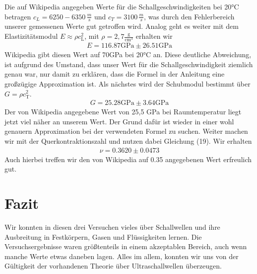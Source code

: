 \documentclass[a4paper, 12pt]{scrartcl}
\begin{document}
Die auf Wikipedia angegeben Werte für die Schallgeschwindigkeiten bei 20°C betragen $c_L=6250-6350\,\frac{m}{s}$ und $c_T=3100\,\frac{m}{s}$, was durch den Fehlerbereich unserer gemessenen Werte gut getroffen wird. Analog geht es weiter mit dem Elastizitätsmodul $E\approx \rho c_\textrm{L}^2$, mit $\rho = 2,7\frac{\textrm{g}}{\textrm{cm}^3}$ erhalten wir
\begin{align*}
E = 116.87 \textrm{GPa} \pm 26.51 \textrm{GPa}
\end{align*}
Wikipedia gibt diesen Wert auf 70GPa bei 20°C an. Diese deutliche Abweichung, ist aufgrund des Umstand, dass unser Wert für die Schallgeschwindigkeit ziemlich genau war, nur damit zu erklären, dass die Formel in der Anleitung eine großzügige Approximation ist. Als nächstes wird der Schubmodul bestimmt über $G=\rho c_\textrm{T}^2$. 
\begin{align*}
G = 25.28 \textrm{GPa} \pm 3.64 \textrm{GPa}
\end{align*}
Der von Wikipedia angegebene Wert von 25,5 GPa bei Raumtemperatur liegt jetzt viel näher an unserem Wert. Der Grund dafür ist wieder in einer wohl genauern Approximation bei der verwendeten Formel zu suchen. Weiter machen wir mit der Querkontraktionszahl und nutzen dabei Gleichung (19). Wir erhalten 
\begin{align*}
\nu = 0.3620 \pm 0.0473 
\end{align*}
Auch hierbei treffen wir den von Wikipedia auf 0.35 angegebenen Wert erfreulich gut.
\newpage
\section{Fazit}
Wir konnten in diesen drei Versuchen vieles über Schallwellen und ihre Ausbreitung in Festkörpern, Gasen und Flüssigkeiten lernen. Die Versuchsergebnisse waren größtenteils in einem akzeptablen Bereich, auch wenn manche Werte etwas daneben lagen. Alles im allem, konnten wir uns von der Gültigkeit der vorhandenen Theorie über Ultraschallwellen überzeugen.
\end{document}

